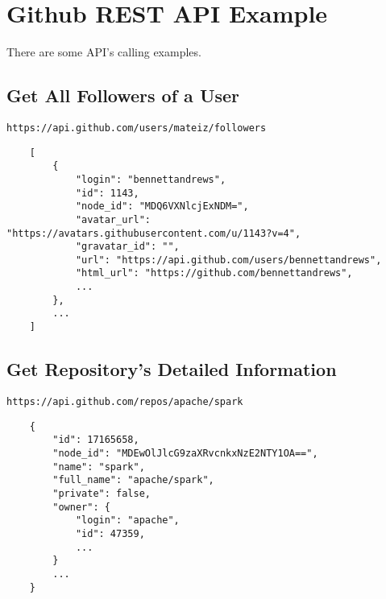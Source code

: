\appendices

\section{Github REST API Example}
\label{a-ghrest}

There are some API's calling examples.


\subsection{Get All Followers of a User}

\begin{verbatim}
https://api.github.com/users/mateiz/followers
\end{verbatim}


\begin{verbatim}
    [
        {
            "login": "bennettandrews",
            "id": 1143,
            "node_id": "MDQ6VXNlcjExNDM=",
            "avatar_url": "https://avatars.githubusercontent.com/u/1143?v=4",
            "gravatar_id": "",
            "url": "https://api.github.com/users/bennettandrews",
            "html_url": "https://github.com/bennettandrews",
            ...
        },
        ...
    ]
\end{verbatim}


\subsection{Get Repository's Detailed Information}

\begin{verbatim}
https://api.github.com/repos/apache/spark
\end{verbatim}


\begin{verbatim}
    {
        "id": 17165658,
        "node_id": "MDEwOlJlcG9zaXRvcnkxNzE2NTY1OA==",
        "name": "spark",
        "full_name": "apache/spark",
        "private": false,
        "owner": {
            "login": "apache",
            "id": 47359,
            ...
        }
        ...
    }
\end{verbatim}



